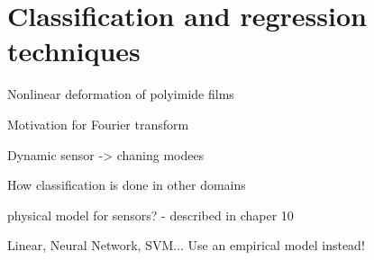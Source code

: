 \chapter{Classification and regression techniques}

Nonlinear deformation of polyimide films

Motivation for Fourier transform

Dynamic sensor -> chaning modees


How classification is done in other domains

physical model for sensors? - described in chaper 10

Linear, Neural Network, SVM... Use an empirical model instead!


